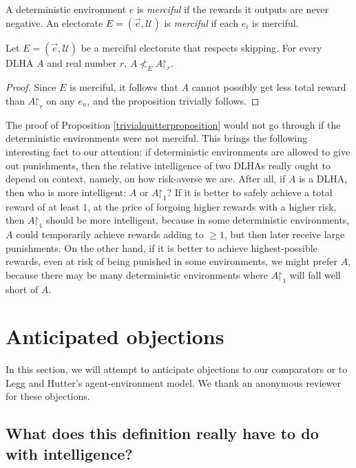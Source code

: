 \documentclass[twoside,11pt]{article}
\begin{document}
\begin{definition}
    A deterministic environment $e$ is \emph{merciful} if
    the rewards it outputs are never negative.
    An electorate $E=(\vec{e},\mathscr U)$ is \emph{merciful}
    if each $e_i$ is merciful.
\end{definition}

\begin{proposition}
\label{trivialquitterproposition}
    Let $E=(\vec{e},\mathscr U)$ be a merciful electorate that respects skipping.
    For every DLHA $A$ and real number $r$, $A\not<_{E}A\mathord{\restriction}_r$.
\end{proposition}

\begin{proof}
    Since $E$ is merciful,
    it follows that $A$ cannot possibly get less total reward than $A\mathord{\restriction}_r$
    on any $e_n$, and the proposition trivially follows.
\end{proof}


The proof of Proposition \ref{trivialquitterproposition} would not go through if
the deterministic environments were not merciful.
This brings the following interesting fact to our attention:
if deterministic environments are allowed to give out punishments,
then the relative intelligence of two DLHAs really ought to depend on
context, namely, on how risk-averse we are.
After all, if $A$ is a DLHA, then who
is more intelligent: $A$ or $A\mathord{\restriction}_1$?
If it is better to safely achieve a total reward of at
least $1$, at the price of forgoing higher rewards with a higher risk,
then $A\mathord{\restriction}_1$
should be more intelligent, because in some deterministic environments,
$A$ could temporarily achieve rewards adding to $\geq 1$, but then later
receive large punishments. On the other hand, if
it is better to achieve highest-possible rewards, even at risk of being punished
in some environments, we might prefer $A$, because there may be many deterministic environments
where $A\mathord{\restriction}_1$ will fall well short of $A$.


\section{Anticipated objections}

In this section, we will attempt to anticipate objections to our comparators or to
Legg and Hutter's agent-environment model. We thank an anonymous reviewer for
these objections.

\subsection{What does this definition really have to do with intelligence?}
\end{document}

